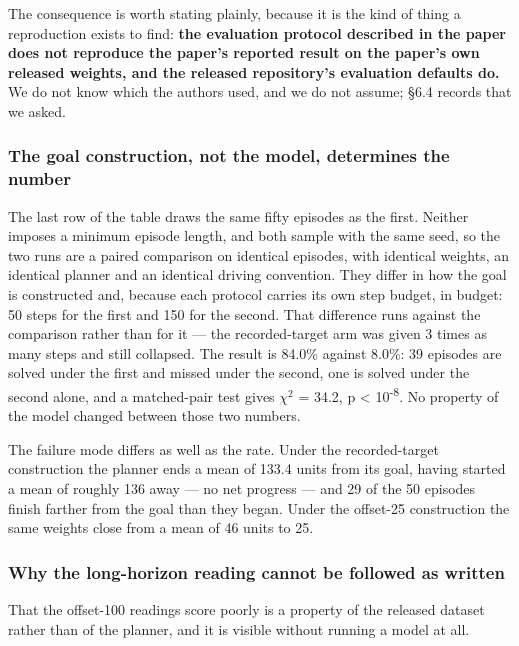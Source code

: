 \documentclass[10pt]{article}
\begin{document}
The consequence is worth stating plainly, because it is the kind of thing a
reproduction exists to find: \textbf{the evaluation protocol described in the paper
does not reproduce the paper's reported result on the paper's own released
weights, and the released repository's evaluation defaults do.} We do not know
which the authors used, and we do not assume; \S{}6.4 records that we asked.

\subsubsection{The goal construction, not the model, determines the number}\label{the-goal-construction-not-the-model-determines-the-number}

The last row of the table draws the same fifty episodes as the first. Neither
imposes a minimum episode length, and both sample with the same seed, so the
two runs are a paired comparison on identical episodes, with identical weights,
an identical planner and an identical driving convention. They differ in how the goal is constructed and, because each protocol carries its own step budget, in budget: 50 steps for the first and 150 for the second. That difference runs against the comparison rather than for it --- the recorded-target arm was given 3 times as many steps and still collapsed. The result is 84.0\% against 8.0\%: 39 episodes are
solved under the first and missed under the second, one is solved under the
second alone, and a matched-pair test gives $\chi^{2}$ = 34.2, p \textless{} 10\textsuperscript{-8}. No property of
the model changed between those two numbers.

The failure mode differs as well as the rate. Under the recorded-target
construction the planner ends a mean of 133.4 units from its goal, having
started a mean of roughly 136 away --- no net progress --- and 29 of
the 50 episodes finish farther from the goal than they began. Under the offset-25
construction the same weights close from a mean of 46 units to 25.

\subsubsection{Why the long-horizon reading cannot be followed as written}\label{why-the-long-horizon-reading-cannot-be-followed-as-written}

That the offset-100 readings score poorly is a property of the released dataset
rather than of the planner, and it is visible without running a model at all.
\end{document}
